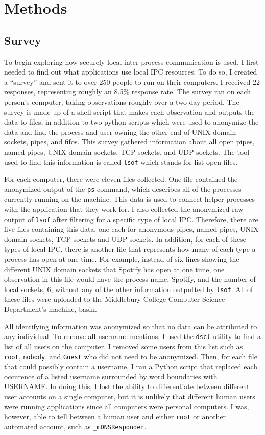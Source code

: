 \chapter{Methods}
\label{sec:methods}

\section{Survey}
\label{sec:survey}
To begin exploring how securely local inter-process communication is used, I first needed to find out what applications use local IPC resources.  To do so, I created a ``survey'' and sent it to over 250 people to run on their computers.  I received 22 responses, representing roughly an 8.5\% response rate.  The survey ran on each person's computer, taking observations roughly over a two day period.  The survey is made up of a shell script that makes each observation and outputs the data to files, in addition to two python scripts which were used to anonymize the data and find the process and user owning the other end of UNIX domain sockets, pipes, and fifos.  This survey gathered information about all open pipes, named pipes, UNIX domain sockets, TCP sockets, and UDP sockets.  The tool used to find this information is called \texttt{lsof} which stands for list open files.

For each computer, there were eleven files collected.  One file contained the anonymized output of the \texttt{ps} command, which describes all of the processes currently running on the machine.  This data is used to connect helper processes with the application that they work for.  I also collected the anonymized raw output of \texttt{lsof} after filtering for a specific type of local IPC.  Therefore, there are five files containing this data, one each for anonymous pipes, named pipes, UNIX domain sockets, TCP sockets and UDP sockets.  In addition, for each of these types of local IPC, there is another file that represents how many of each type a process has open at one time.  For example, instead of six lines showing the different UNIX domain sockets that Spotify has open at one time, one observation in this file would have the process name, Spotify, and the number of local sockets, 6, without any of the other information outputted by \texttt{lsof}.  All of these files were uploaded to the Middlebury College Computer Science Department's machine, basin.

All identifying information was anonymized so that no data can be attributed to any individual.  To remove all username mentions, I used the \texttt{dscl} utility to find a list of all users on the computer.  I removed some users from this list such as \texttt{root}, \texttt{nobody}, and \texttt{Guest} who did not need to be anonymized.  Then, for each file that could possibly contain a username, I ran a Python script that replaced each occurence of a listed username surrounded by word boundaries with USERNAME.  In doing this, I lost the ability to differentiate between different user accounts on a single computer, but it is unlikely that different human users were running applications since all computers were personal computers.  I was, however, able to tell between a human user and either \texttt{root} or another automated account, such as \texttt{\_mDNSResponder}.

